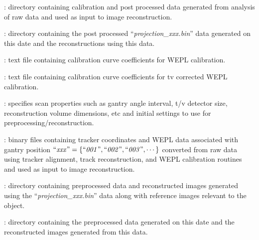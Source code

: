 \documentclass[landscape,12pt]{article}
\begin{document}
\begin{myEnumerate}[labelindent=1pt, leftmargin=*]
\begin{myEnumerate}[labelindent=1pt, leftmargin=*]
\begin{myEnumerate}[labelindent=1pt, leftmargin=*]
\begin{myEnumerate}[labelindent=1pt, leftmargin=*]
\begin{myEnumerate}[labelindent=1pt, leftmargin=*]
\begin{myEnumerate}[labelindent=1pt, leftmargin=*]
                        \end{myEnumerate}
                        \item {} \color{Black}: directory containing calibration and post processed data generated from analysis of raw data and used as input to image reconstruction.
                        \begin{myEnumerate}[labelindent=1pt, leftmargin=*]
                            \item {} \color{Black}: directory containing the post processed ``\textit{projection\_xxx.bin}'' data generated on this date and the reconstructions using this data.
                            \begin{myEnumerate}[labelindent=1pt, leftmargin=*]
                                \item {} \color{Black}: text file containing calibration curve coefficients for WEPL calibration.
                                \item {} \color{Black}: text file containing calibration curve coefficients for tv corrected WEPL calibration.
                                \item {} \color{Black}: specifies scan properties such as gantry angle interval, t/v detector size, reconstruction volume dimensions, etc and initial settings to use for preprocessing/reconstruction.
                                \item {} \color{Black}: binary files containing tracker coordinates and WEPL data associated with gantry position $\textrm{``\textit{xxx}''} =\{\textrm{``\textit{001}''}, \textrm{``\textit{002}''}, \textrm{``\textit{003}''}, \cdots\}$ converted from raw data using tracker alignment, track reconstruction, and WEPL calibration routines and used as input to image reconstruction.
                                \item {} \color{Black}: directory containing preprocessed data and reconstructed images generated using the ``\textit{projection\_xxx.bin}'' data along with reference images relevant to the object.
                                \begin{myEnumerate}[labelindent=1pt, leftmargin=*]
                                    \item {} \color{Black}: directory containing the preprocessed data generated on this date and the reconstructed images generated from this data.

\end{myEnumerate}
\end{myEnumerate}
\end{myEnumerate}
\end{myEnumerate}
\end{myEnumerate}
\end{myEnumerate}
\end{myEnumerate}
\end{myEnumerate}
\end{document}

